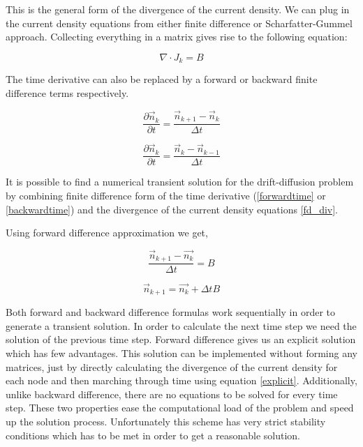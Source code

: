 This is the general form of the divergence of the current density. We can plug in the current density equations from either finite difference or Scharfatter-Gummel approach. Collecting everything in a matrix gives rise to the following equation:

\begin{equation}
\nabla \cdot J_k =B
\label{fd_div}
\end{equation}

The time derivative can also be replaced by a forward or backward finite difference terms respectively.

\begin{equation}
\frac{\partial  \vec{n}_k}{\partial t}=\frac{ \vec{n}_{k+1}-\vec{n}_k}{\Delta t}
\label{forwardtime}
\end{equation}

\begin{equation}
\frac{\partial \vec{n}_k}{\partial t}=\frac{ \vec{n}_k- \vec{n}_{k-1}}{\Delta t}
\label{backwardtime}
\end{equation}

It is possible to find a numerical transient solution for the drift-diffusion problem by combining finite difference form of the time derivative (\eqref{forwardtime} or \eqref{backwardtime}) and the divergence of the current density equations \eqref{fd_div}.

Using forward difference approximation we get,

\begin{equation}\nonumber
\frac{ \vec{n}_{k+1}-\vec{n_k}}{\Delta t}=B
\end{equation}

\begin{equation}
\vec{n}_{k+1}=\vec{n_{k}}+\Delta t B
\label{explicit}
\end{equation}

Both forward and backward difference formulas work sequentially in order to generate a transient solution. In order to calculate the next time step we need the solution of the previous time step. Forward difference gives us an explicit solution which has few advantages. This solution can be implemented without forming any matrices, just by directly calculating the divergence of the current density for each node and then marching through time using equation \ref{explicit}. Additionally, unlike backward difference, there are no equations to be solved for every time step. These two properties ease the computational load of the problem and speed up the solution process. Unfortunately this scheme has very strict stability conditions which has to be met in order to get a reasonable solution.

